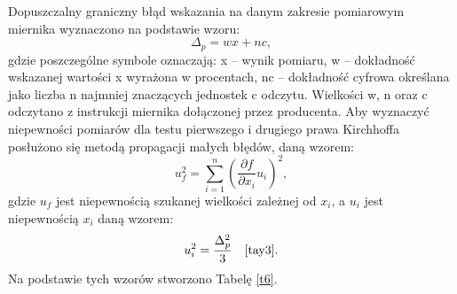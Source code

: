 \documentclass[10pt,a4paper]{article}
\begin{document}
 Dopuszczalny graniczny błąd wskazania na danym zakresie pomiarowym miernika wyznaczono na podstawie wzoru:
\begin{equation}
\label{r10}
\Delta_{p}=wx+nc,
\end{equation}
gdzie poszczególne symbole oznaczają: x – wynik pomiaru, w – dokładność wskazanej wartości x wyrażona w procentach, nc – dokładność cyfrowa określana jako liczba n najmniej znaczących jednostek c odczytu. Wielkości w, n oraz c odczytano z instrukcji miernika dołączonej przez producenta. Aby wyznaczyć niepewności pomiarów dla testu pierwszego i drugiego prawa Kirchhoffa posłużono się metodą propagacji małych błędów, daną wzorem:
 \begin{equation}
 \label{r11}
 u_{f}^2=\sum_{i=1}^n \left( \dfrac{\partial f}{\partial x_{i}}u_{i}\right) ^2,
 \end{equation}
 gdzie $u_{f}$ jest niepewnością szukanej wielkości zależnej od $x_{i}$, a $u_{i}$ jest niepewnością $x_{i}$ daną wzorem:
 \begin{equation}
  u_{i}^2=\dfrac{\Delta_{p}^2}{3} \quad \cite{tay3}.
  \end{equation} 
 Na podstawie tych wzorów stworzono Tabelę \ref{t6}.
 
\end{document}
